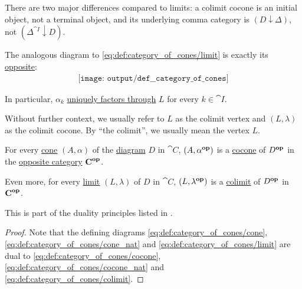 \begin{definition}
\begin{thmenum}
    There are two major differences compared to limits: a colimit cocone is an initial object, not a terminal object, and its underlying comma category is \( (D \downarrow \Delta) \), not \( (\Delta^{\cat{I}} \downarrow D) \).

    The analogous diagram to \eqref{eq:def:category_of_cones/limit} is exactly its \hyperref[thm:categorical_principle_of_duality]{opposite}:
    \begin{equation}\label{eq:def:category_of_cones/colimit}
      \begin{aligned}
        \texttt{[image: output/def\_\_category\_of\_cones]}
      \end{aligned}
    \end{equation}

    In particular, \( \alpha_k \) \hyperref[def:factors_through]{uniquely factors through} \( L \) for every \( k \in \cat{I} \).

    Without further context, we usually refer to \( L \) as the colimit vertex and \( (L, \lambda) \) as the colimit cocone. By \enquote{the colimit}, we usually mean the vertex \( L \).
  \end{thmenum}
\end{definition}

\begin{proposition}\label{thm:categorical_limit_duality}
  For every \hyperref[def:category_of_cones/cone]{cone} \( (A, \alpha) \) of the \hyperref[def:categorical_diagram]{diagram} \( D \) in \( \cat{C} \), \( (A, \alpha^\oppos) \) is a \hyperref[def:category_of_cones/cone]{cocone} of \( D^\oppos \) in the \hyperref[def:opposite_category]{opposite category} \( \cat{C}^\oppos \).

  Even more, for every \hyperref[def:category_of_cones/limit]{limit} \( (L, \lambda) \) of \( D \) in \( \cat{C} \), \( (L, \lambda^\oppos) \) is a \hyperref[def:category_of_cones/colimit]{colimit} of \( D^\oppos \) in \( \cat{C}^\oppos \).

  This is part of the duality principles listed in .
\end{proposition}
\begin{proof}
  Note that the defining diagrams \eqref{eq:def:category_of_cones/cone}, \eqref{eq:def:category_of_cones/cone_nat} and \eqref{eq:def:category_of_cones/limit} are dual to \eqref{eq:def:category_of_cones/cocone}, \eqref{eq:def:category_of_cones/cocone_nat} and \eqref{eq:def:category_of_cones/colimit}.
\end{proof}

